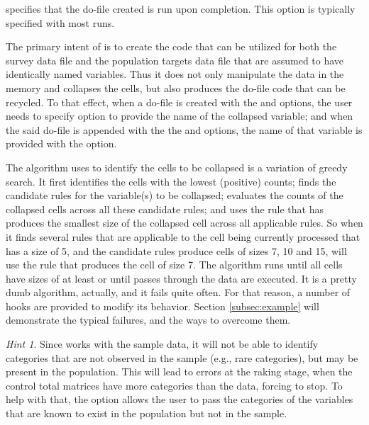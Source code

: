 \hangpara
{} specifies that the do-file created is run upon completion. This option is typically specified with most runs.

The primary intent of  is to create the code that can be
utilized for both the survey data file and the population targets data file that
are assumed to have identically named variables. Thus it does not only manipulate the data in the memory
and collapses the cells, but also produces the do-file code that can be recycled.
To that effect, when a do-file is created with the  and  options,
the user needs to specify  option to provide the name of the collapsed variable;
and when the said do-file is appended with the the  and  options,
the name of that variable is provided with the  option.

The algorithm  uses to identify the cells to be collapsed is
a variation of greedy search.
It first identifies the cells with the lowest (positive) counts; finds the candidate rules
for the variable(s) to be collapsed; evaluates the counts of the collapsed cells across all
these candidate rules; and uses the rule that has produces the smallest size of the
collapsed cell across all applicable rules. So when it finds several rules that are applicable
to the cell being currently processed that has a size of 5, and the candidate rules produce cells
of sizes 7, 10 and 15,  will use the rule that produces the cell
of size 7. The algorithm runs until all cells have sizes of at least
 or until  passes through the data are executed.
It is a pretty dumb algorithm, actually, and it fails quite often.
For that reason, a number of hooks are provided to modify its behavior.
Section \ref{subsec:example} will demonstrate the typical failures, and the ways to overcome them.

\textit{Hint 1}. Since  works with the sample data,
it will not be able to identify categories that are not observed in the sample (e.g., rare categories),
but may be present in the population. This will lead to errors at the raking stage,
when the control total matrices have more categories than the data, forcing  to stop.
To help with that, the option  allows the user to pass the categories
of the variables that are known to exist in the population but not in the sample.

